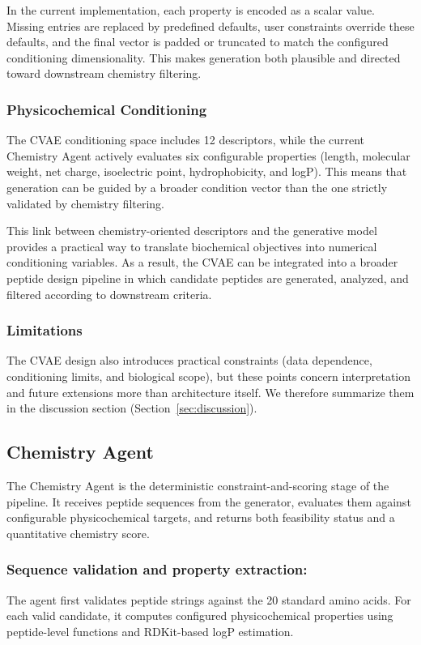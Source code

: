 In the current implementation, each property is encoded as a scalar value. Missing entries are replaced by predefined defaults, user constraints override these defaults, and the final vector is padded or truncated to match the configured conditioning dimensionality. This makes generation both plausible and directed toward downstream chemistry filtering.

\subsubsection{Physicochemical Conditioning}

The CVAE conditioning space includes 12 descriptors, while the current Chemistry Agent actively evaluates six configurable properties (length, molecular weight, net charge, isoelectric point, hydrophobicity, and logP). This means that generation can be guided by a broader condition vector than the one strictly validated by chemistry filtering.

This link between chemistry-oriented descriptors and the generative model provides a practical way to translate biochemical objectives into numerical conditioning variables. As a result, the CVAE can be integrated into a broader peptide design pipeline in which candidate peptides are generated, analyzed, and filtered according to downstream criteria.

\subsubsection{Limitations}

The CVAE design also introduces practical constraints (data dependence, conditioning limits, and biological scope), but these points concern interpretation and future extensions more than architecture itself. We therefore summarize them in the discussion section (Section~\ref{sec:discussion}).

\subsection{Chemistry Agent}\label{subsec:chemistry}
The Chemistry Agent is the deterministic constraint-and-scoring stage of the pipeline. It receives peptide sequences from the generator, evaluates them against configurable physicochemical targets, and returns both feasibility status and a quantitative chemistry score.

\subsubsection{Sequence validation and property extraction:}
The agent first validates peptide strings against the 20 standard amino acids. For each valid candidate, it computes configured physicochemical properties using peptide-level functions and RDKit-based logP estimation.


